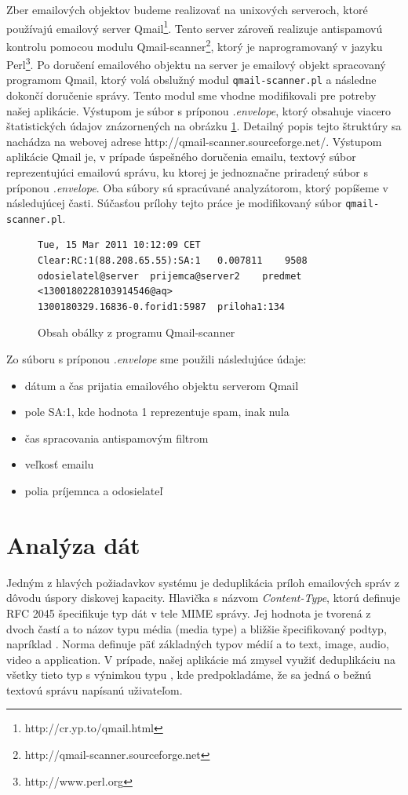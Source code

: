 \documentclass[11pt,twoside,a4paper]{book}
\begin{document}
Zber emailových objektov budeme realizovať na unixových serveroch, ktoré používajú emailový server Qmail\footnote{http://cr.yp.to/qmail.html}. Tento server zároveň realizuje antispamovú kontrolu pomocou modulu Qmail-scanner\footnote{http://qmail-scanner.sourceforge.net}, ktorý je naprogramovaný v jazyku Perl\footnote{http://www.perl.org}. Po doručení emailového objektu na server je emailový objekt spracovaný programom Qmail, ktorý volá obslužný modul \verb|qmail-scanner.pl| a následne dokončí doručenie správy. Tento modul sme vhodne modifikovali pre potreby našej aplikácie. Výstupom je súbor s príponou \emph{.envelope}, ktorý obsahuje viacero štatistických údajov znázornených na obrázku \ref{fig:envelope}. Detailný popis tejto štruktúry sa nachádza na webovej adrese http://qmail-scanner.sourceforge.net/. Výstupom aplikácie Qmail je, v prípade úspešného doručenia emailu, textový súbor reprezentujúci emailovú správu, ku ktorej je jednoznačne priradený súbor s príponou \emph{.envelope}. Oba súbory sú spracúvané analyzátorom, ktorý popíšeme v následujúcej časti. Súčasťou prílohy tejto práce je modifikovaný súbor \verb|qmail-scanner.pl|.

\begin{figure}[h]
\begin{verbatim}
Tue, 15 Mar 2011 10:12:09 CET	Clear:RC:1(88.208.65.55):SA:1	0.007811	9508	odosielatel@server	prijemca@server2	predmet	<1300180228103914546@aq>	
1300180329.16836-0.forid1:5987	priloha1:134
\end{verbatim}
 \caption{Obsah obálky z programu Qmail-scanner}
 \label{fig:envelope}
\end{figure}

\noindent
Zo súboru s príponou \emph{.envelope} sme použili následujúce údaje:
\begin{itemize}
 \item dátum a čas prijatia emailového objektu serverom Qmail
 \item pole SA:1, kde hodnota 1 reprezentuje spam, inak nula
 \item čas spracovania antispamovým filtrom
 \item veľkosť emailu
 \item polia príjemnca a odosielateľ
\end{itemize}


\section{Analýza dát}
Jedným z hlavých požiadavkov systému je deduplikácia príloh emailových správ z dôvodu úspory diskovej kapacity. Hlavička s názvom \emph{Content-Type}, ktorú definuje RFC 2045 špecifikuje typ dát v tele MIME správy. Jej hodnota je tvorená z dvoch častí a to názov typu média (media type) a bližšie špecifikovaný podtyp, napríklad \emph{}. Norma definuje päť základných typov médií a to text, image, audio, video a application. V prípade, našej aplikácie má zmysel využiť deduplikáciu na všetky tieto typ s výnimkou typu \emph{}, kde predpokladáme, že sa jedná o bežnú textovú správu napísanú uživateľom.
\end{document}
